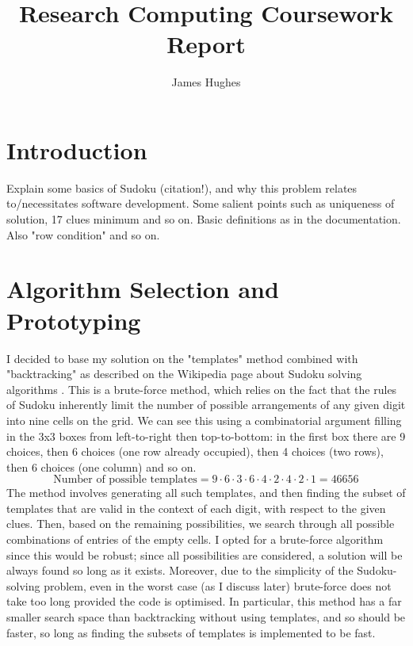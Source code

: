 \documentclass[12pt]{article}
\title{Research Computing Coursework Report}
\author{James Hughes}
\begin{document}
\maketitle
\newpage


\section*{Introduction}
Explain some basics of Sudoku (citation!), and why this problem relates to/necessitates software development.
Some salient points such as uniqueness of solution, 17 clues minimum \cite{wiki2} and so on.
Basic definitions as in the documentation. Also "row condition" and so on.

\section*{Algorithm Selection and Prototyping}
I decided to base my solution on the "templates" method combined with "backtracking" as described on the Wikipedia page about Sudoku solving algorithms \cite{wiki1}.
This is a brute-force method, which relies on the fact that the rules of Sudoku inherently limit the number of possible arrangements of any given digit into nine cells on the grid.
We can see this using a combinatorial argument filling in the 3x3 boxes from left-to-right then top-to-bottom: in the first box there are 9 choices, then 6 choices (one row already occupied), then 4 choices (two rows), then 6 choices (one column) and so on.
\[
    \text{Number of possible templates} = 9\cdot6\cdot3\cdot6\cdot4\cdot2\cdot4\cdot2\cdot1 = 46656
\]
The method involves generating all such templates, and then finding the subset of templates that are valid in the context of each digit, with respect to the given clues.
Then, based on the remaining possibilities, we search through all possible combinations of entries of the empty cells.
I opted for a brute-force algorithm since this would be robust; since all possibilities are considered, a solution will be always found so long as it exists.
Moreover, due to the simplicity of the Sudoku-solving problem, even in the worst case (as I discuss later) brute-force does not take too long provided the code is optimised.
In particular, this method has a far smaller search space than backtracking without using templates, and so should be faster, so long as finding the subsets of templates is implemented to be fast.
\end{document}
